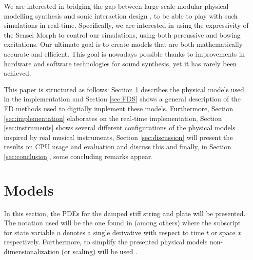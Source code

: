 \documentclass{article}
\begin{document}
We are interested in bridging the gap between large-scale modular physical modelling synthesis and sonic interaction design \cite{franinovic2013sonic}, to be able to play with such simulations in real-time. Specifically, we are interested in using the expressivity of the Sensel Morph \cite{sensel2018} to control our simulations, using both percussive and bowing excitations. Our ultimate goal is to create models that are both mathematically accurate and efficient. This goal is nowadays possible thanks to improvements in hardware and software technologies for sound synthesis, yet it has rarely been achieved.


This paper is structured as follows: Section \ref{sec:PDE} describes the physical models used in the implementation and Section \ref{sec:FDS} shows a general description of the FD methods used to digitally implement these models. Furthermore, Section \ref{sec:implementation} elaborates on the real-time implementation, Section \ref{sec:instruments} shows several different configurations of the physical models inspired by real musical instruments, Section \ref{sec:discussion} will present the results on CPU usage and evaluation and discuss this and finally, in Section \ref{sec:conclusion}, some concluding remarks appear.

\section{Models}\label{sec:PDE}
In this section, the PDEs for the damped stiff string and plate will be presented. The notation used will be the one found in \cite{Bilbao2009:NumericalSoundSynthesis} (among others) where the subscript for state variable $u$ denotes a single derivative with respect to time $t$ or space $x$ respectively. Furthermore, to simplify the presented physical models non-dimensionalization (or scaling) will be used \cite{Bilbao2009:NumericalSoundSynthesis}. 

\end{document}
